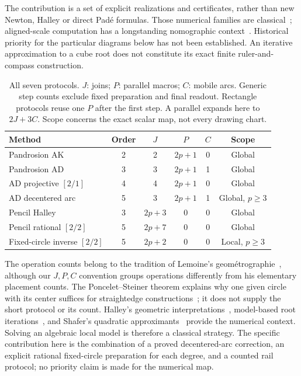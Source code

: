 \documentclass[11pt,a4paper]{article}
\theoremstyle{remark}\newtheorem{remark}[theorem]{Remark}
\begin{document}
The contribution is a set of explicit realizations and certificates, rather than new Newton, Halley or direct Pad\'e formulas. Those numerical families are classical~\cite{dlmf38,laszkiewicz2009,zietakSlides2009}; aligned-scale computation has a longstanding nomographic context~\cite{docagne1925}. Historical priority for the particular diagrams below has not been established. An iterative approximation to a cube root does not constitute its exact finite ruler-and-compass construction.

\begin{table}[H]\centering\small
\caption{All seven protocols. $J$: joins; $P$: parallel macros; $C$: mobile arcs. Generic step counts exclude fixed preparation and final readout. Rectangle protocols reuse one $P$ after the first step. A parallel expands here to $2J+3C$. Scope concerns the exact scalar map, not every drawing chart.}
\begin{tabularx}{\linewidth}{@{}Xccccc@{}}\toprule
Method & Order & $J$ & $P$ & $C$ & Scope\\\midrule
Pandrosion AK & 2 & 2 & $2p+1$ & 0 & Global\\
Pandrosion AD & 3 & 3 & $2p+1$ & 1 & Global\\
AD projective $[2/1]$ & 4 & 4 & $2p+1$ & 0 & Global\\
AD decentered arc & 5 & 3 & $2p+1$ & 1 & Global, $p\ge3$\\\midrule
Pencil Halley & 3 & $2p+3$ & 0 & 0 & Global\\
Pencil rational $[2/2]$ & 5 & $2p+7$ & 0 & 0 & Global\\
Fixed-circle inverse $[2/2]$ & 5 & $2p+2$ & 0 & 0 & Local, $p\ge3$\\\bottomrule
\end{tabularx}\label{tab:main}
\end{table}

The operation counts belong to the tradition of Lemoine's geom\'etrographie~\cite{lemoine1902}, although our $J,P,C$ convention groups operations differently from his elementary placement counts. The Poncelet--Steiner theorem explains why one given circle with its center suffices for straightedge constructions~\cite{steiner1833}; it does not supply the short protocol or its count. Halley's geometric interpretations~\cite{gander1985,scavo1995}, model-based root iterations~\cite{traub1961,traub1964}, and Shafer's quadratic approximants~\cite{shafer1974} provide the numerical context. Solving an algebraic local model is therefore a classical strategy. The specific contribution here is the combination of a proved decentered-arc correction, an explicit rational fixed-circle preparation for each degree, and a counted rail protocol; no priority claim is made for the numerical map.
\end{document}
